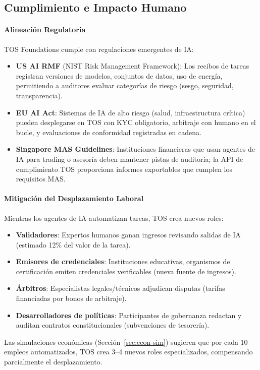 \documentclass[11pt]{article}
\begin{document}
\subsection{Cumplimiento e Impacto Humano}
\paragraph{Alineación Regulatoria} TOS Foundations cumple con regulaciones emergentes de IA:
\begin{itemize}[noitemsep]
  \item \textbf{US AI RMF} (NIST Risk Management Framework): Los recibos de tareas registran versiones de modelos, conjuntos de datos, uso de energía, permitiendo a auditores evaluar categorías de riesgo (sesgo, seguridad, transparencia).
  \item \textbf{EU AI Act}: Sistemas de IA de alto riesgo (salud, infraestructura crítica) pueden desplegarse en TOS con KYC obligatorio, arbitraje con humano en el bucle, y evaluaciones de conformidad registradas en cadena.
  \item \textbf{Singapore MAS Guidelines}: Instituciones financieras que usan agentes de IA para trading o asesoría deben mantener pistas de auditoría; la API de cumplimiento TOS proporciona informes exportables que cumplen los requisitos MAS.
\end{itemize}

\paragraph{Mitigación del Desplazamiento Laboral} Mientras los agentes de IA automatizan tareas, TOS crea nuevos roles:
\begin{itemize}[noitemsep]
  \item \textbf{Validadores}: Expertos humanos ganan ingresos revisando salidas de IA (estimado 12\% del valor de la tarea).
  \item \textbf{Emisores de credenciales}: Instituciones educativas, organismos de certificación emiten credenciales verificables (nueva fuente de ingresos).
  \item \textbf{Árbitros}: Especialistas legales/técnicos adjudican disputas (tarifas financiadas por bonos de arbitraje).
  \item \textbf{Desarrolladores de políticas}: Participantes de gobernanza redactan y auditan contratos constitucionales (subvenciones de tesorería).
\end{itemize}
Las simulaciones económicas (Sección~\ref{sec:econ-sim}) sugieren que por cada 10 empleos automatizados, TOS crea 3--4 nuevos roles especializados, compensando parcialmente el desplazamiento.
\end{document}
